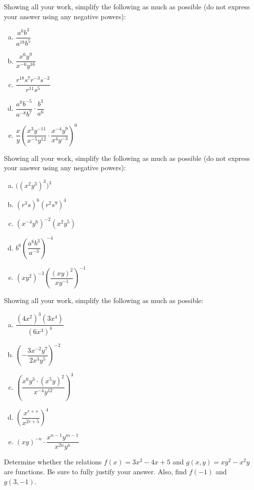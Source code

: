 \documentclass[11pt,letterpaper]{article}
\begin{document}
\prob Showing all your work, simplify the following as much as possible (do not express your answer using any negative powers): 
	\begin{enumerate}[(a)]
	\item $\dfrac{a^6 b^3}{a^{18} b^5}$
	\item $\dfrac{x^6 y^9}{x^{-6} y^{16}}$
	\item $\dfrac{r^{18} s^7 r^{-3} s^{-2}}{ r^{11} s^5}$
	\item $\dfrac{a^0 b^{-5}}{a^{-8} b^7} \cdot \dfrac{b^3}{a^6}$
	\item $\dfrac{x}{y} \left( \dfrac{x^3 y^{-11}}{x^{-5} y^{12}} \cdot \dfrac{x^{-4} y^9}{x^4 y^{-3}} \right)^0$
	\end{enumerate} \pspace


\prob Showing all your work, simplify the following as much as possible (do not express your answer using any negative powers): 
	\begin{enumerate}[(a)]
	\item $\big( (x^2 y^3)^3 \big)^3$
	\item $(r^3s)^6 (r^2s^9)^4$	
	\item $(x^{-4} y^6)^{-2} (x^2 y^5)$
	\item $b^6 \left( \dfrac{a^6 b^3}{a^{-3}} \right)^{-4}$
	\item $(xy^2)^{-3} \left( \dfrac{(xy)^2}{xy^{-1}} \right)^{-1}$
	\end{enumerate} \pspace


\prob Showing all your work, simplify the following as much as possible:
	\begin{enumerate}[(a)]
	\item $\dfrac{(4x^2)^3 (3x^4)}{(6x^3)^4}$
	\item $\left( - \dfrac{3x^{-2} y^7}{2x^3 y^5} \right)^{-2}$
	\item $\left( \dfrac{x^6 y^3 \cdot (x^5y)^2}{x^{-4} y^{12}} \right)^3$
	\item $\left( \dfrac{x^{r + s}}{x^{2r + 5}} \right)^4$
	\item $(xy)^{-n} \cdot \dfrac{x^{n - 1} y^{m - 1}}{x^{2n} y^n}$
	\end{enumerate} \pspace


\prob Determine whether the relations $f(x)= 3x^2 - 4x + 5$ and $g(x, y)= xy^2 - x^2y$ are functions. Be sure to fully justify your answer. Also, find $f(-1)$ and $g(3, -1)$. \pspace
\end{document}
